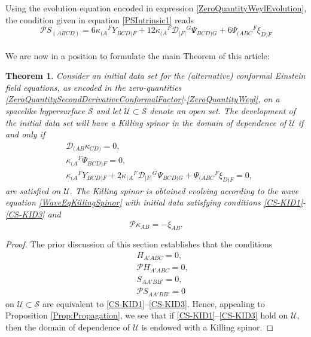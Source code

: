 \documentclass[10pt,a4paper]{article}
\theoremstyle{plain}
\newtheorem{theorem}{Theorem}
\begin{document}
Using the evolution equation encoded in expression
\eqref{ZeroQuantityWeylEvolution}, the condition given in equation
\eqref{PSIntrinsic1} reads
\begin{equation}\label{NonTrivialCondition}
\mathcal{P}S_{(ABCD)} =6 \kappa_{(A}{}^{F}Y_{BCD)F} + 12
\kappa_{(A}{}^{F}\mathcal{D}_{|F|}{}^{G}\Psi_{BCD)G} + 6
\Psi_{(ABC}{}^{F}\xi_{D)F}
\end{equation}
\\ We are now in a position to formulate the main Theorem of this
article:
\begin{theorem}\label{MainTheorem}
Consider an initial data set for the (alternative) conformal Einstein
field equations, as encoded in the zero-quantities
\eqref{ZeroQuantitySecondDerivativeConformalFactor}-\eqref{ZeroQuantityWeyl},
on a spacelike hypersurface $\mathcal{S}$ and let
$\mathcal{U}\subset\mathcal{S}$ denote an open set.  The development
of the initial data set will have a Killing spinor in the domain of
dependence of $\mathcal{U}$ if and only if
\begin{subequations}
\begin{flalign}
&\mathcal{D}_{(AB}\kappa_{CD)}=0, \label{CS-KID1}\tag{C1}
  \\ &\kappa_{(A}{}^{F}\Psi_{BCD)F}=0, \label{CS-KID2}\tag{C2}\\ &\kappa_{(A}{}^{F}Y_{BCD)F}
  + 2 \kappa_{(A}{}^{F}\mathcal{D}_{|F|}{}^{G}\Psi_{BCD)G} +
  \Psi_{(ABC}{}^{F}\xi_{D)F}=0,\label{CS-KID3}\tag{C3}
\end{flalign}
\end{subequations}
are satisfied on $\mathcal{U}$. The Killing spinor is obtained
evolving according to the wave equation \eqref{WaveEqKillingSpinor}
with initial data satisfying conditions
\eqref{CS-KID1}-\eqref{CS-KID3} and
\begin{equation}
\mathcal{P}\kappa_{AB}=-\xi_{AB}.
\end{equation}
\end{theorem}
\begin{proof}
The prior discussion of this section establishes that the conditions
\begin{eqnarray*}
&& H_{A'ABC}=0,\\ 
&& \mathcal{P}
  H_{A'ABC}=0,\\
&& S_{AA'BB'}=0,\\ 
&&\mathcal{P}S_{AA'BB'}=0 
\end{eqnarray*}
on $\mathcal{U}\subset \mathcal{S}$ are equivalent to \eqref{CS-KID1}--\eqref{CS-KID3}. 
Hence, appealing to Proposition \ref{Prop:Propagation}, we see that if \eqref{CS-KID1}--\eqref{CS-KID3}
hold on $\mathcal{U}$, then the domain of dependence of $\mathcal{U}$ is endowed with a Killing spinor.  
\end{proof}
\end{document}
